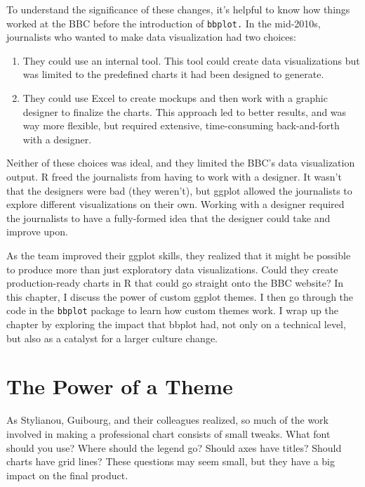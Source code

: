 \documentclass[
]{book}
\begin{document}
To understand the significance of these changes, it's helpful to know how things worked at the BBC before the introduction of \texttt{bbplot.} In the mid-2010s, journalists who wanted to make data visualization had two choices:

\begin{enumerate}
\def\labelenumi{\arabic{enumi}.}
\item
  They could use an internal tool. This tool could create data visualizations but was limited to the predefined charts it had been designed to generate.
\item
  They could use Excel to create mockups and then work with a graphic designer to finalize the charts. This approach led to better results, and was way more flexible, but required extensive, time-consuming back-and-forth with a designer.
\end{enumerate}

Neither of these choices was ideal, and they limited the BBC's data visualization output. R freed the journalists from having to work with a designer. It wasn't that the designers were bad (they weren't), but ggplot allowed the journalists to explore different visualizations on their own. Working with a designer required the journalists to have a fully-formed idea that the designer could take and improve upon.

As the team improved their ggplot skills, they realized that it might be possible to produce more than just exploratory data visualizations. Could they create production-ready charts in R that could go straight onto the BBC website? In this chapter, I discuss the power of custom ggplot themes. I then go through the code in the \texttt{bbplot} package to learn how custom themes work. I wrap up the chapter by exploring the impact that bbplot had, not only on a technical level, but also as a catalyst for a larger culture change.

\hypertarget{the-power-of-a-theme}{%
\section*{The Power of a Theme}\label{the-power-of-a-theme}}

As Stylianou, Guibourg, and their colleagues realized, so much of the work involved in making a professional chart consists of small tweaks. What font should you use? Where should the legend go? Should axes have titles? Should charts have grid lines? These questions may seem small, but they have a big impact on the final product.
\end{document}
